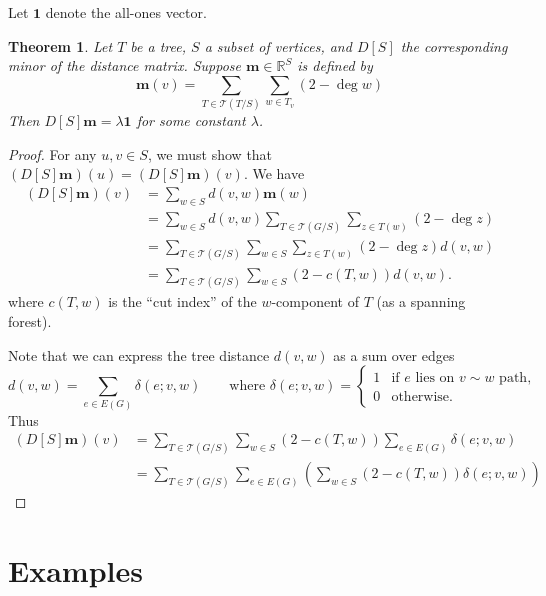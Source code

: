 \documentclass{amsart}
\newtheorem{thm}{Theorem}
\theoremstyle{definition}
\newcommand{\RR}{\mathbb{R}}
\begin{document}
Let $\mathbf{1}$ denote the all-ones vector.
\begin{thm}
Let $T$ be a tree, $S$ a subset of vertices,
and $D[S]$ the corresponding minor of the distance matrix.
Suppose $\mathbf{m} \in \RR^{S}$ is defined by
\begin{equation*}
\mathbf{m}(v) = \sum_{T \in \mathcal T(T/S)} \sum_{w \in T_v} (2 - \deg w) 
\end{equation*}
Then
$D[S] \mathbf{m} = \lambda \mathbf{1}$
for some constant $\lambda$.
\end{thm}
\begin{proof}
For any $u,v \in S$, 
we must show that $(D[S] \mathbf{m})(u) = (D[S] \mathbf{m})(v)$.
We have
\begin{align*}
 (D[S] \mathbf{m})(v) &= \sum_{w \in S} d(v,w) \mathbf{m}(w) \\
 &= \sum_{w \in S} d(v,w) \sum_{T \in \mathcal T(G/S)} \sum_{z \in T(w)} (2 - \deg z) \\
 &= \sum_{T \in \mathcal T(G/S)} \sum_{w \in S} \sum_{z \in T(w)} (2 - \deg z) d(v,w) \\
 &= \sum_{T \in \mathcal T(G/S)} \sum_{w \in S} (2 - c(T,w)) d(v,w).
\end{align*}
where $c(T,w)$ is the ``cut index'' of the $w$-component of $T$ (as a spanning forest).

Note that we can express the tree distance $d(v,w)$ as a sum over edges
\begin{equation*}
d(v,w) = \sum_{e \in E(G)} \delta(e; v,w)
\qquad\text{where } \delta(e; v,w) = \begin{cases}
1 &\text{if $e$ lies on $v\sim w$ path}, \\
0 &\text{otherwise}.
\end{cases}
\end{equation*}
Thus
\begin{align*}
(D[S] \mathbf{m})(v) &= \sum_{T \in \mathcal T(G/S)} \sum_{w \in S} (2 - c(T,w))  \sum_{e \in E(G)} \delta(e;v,w) \\
&= \sum_{T \in \mathcal T(G/S)} \sum_{e \in E(G)} \left( \sum_{w \in S}(2 - c(T,w))   \delta(e;v,w) \right)
\end{align*}
\end{proof}


\section{Examples}
\end{document}
